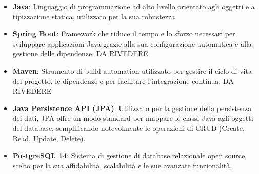 \begin{itemize}
    \item \textbf{Java}: Linguaggio di programmazione ad alto livello orientato agli oggetti e 
    a tipizzazione statica, utilizzato per la sua robustezza.

    \item \textbf{Spring Boot}: Framework che riduce il tempo e lo sforzo necessari 
    per sviluppare applicazioni Java grazie alla sua configurazione automatica 
    e alla gestione delle dipendenze. DA RIVEDERE

    \item \textbf{Maven}: Strumento di build automation utilizzato per gestire il ciclo di vita del progetto, 
    le dipendenze e per facilitare l'integrazione continua. DA RIVEDERE

    \item \textbf{Java Persistence API (JPA)}: Utilizzato per la gestione della persistenza dei dati, 
    JPA offre un modo standard per mappare le classi Java agli oggetti del database, 
    semplificando notevolmente le operazioni di CRUD (Create, Read, Update, Delete).

    \item \textbf{PostgreSQL 14}: Sistema di gestione di database relazionale open source, 
    scelto per la sua affidabilità, scalabilità e le sue avanzate funzionalità.

\end{itemize}
